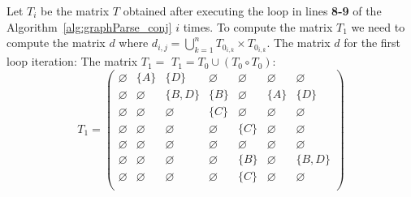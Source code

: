 Let $T_i$ be the matrix $T$ obtained after executing the loop in lines \textbf{8-9} of the Algorithm~\ref{alg:graphParse_conj} $i$ times. To compute the matrix $T_1$ we need to compute the matrix $d$ where $d_{i,j} = \bigcup^{n}_{k=1}{T_{0_{i,k}} \times T_{0_{i,k}}}$. The matrix $d$ for the first loop iteration:
    \noindent
 The matrix $T_1 = $ $T_1 = T_0 \cup (T_0 \circ T_0)$:
{\small
    \[
    T_1 = \begin{pmatrix}
    \varnothing & \{A\} & \{D\} & \varnothing & \varnothing & \varnothing & \varnothing \\
    
    \varnothing & \varnothing & \{B, D\} & \{B\} & \varnothing & \{A\} & \{D\} \\
    
    \varnothing & \varnothing & \varnothing & \{C\} & \varnothing & \varnothing & \varnothing \\
    
    \varnothing & \varnothing & \varnothing & \varnothing & \{C\} & \varnothing & \varnothing \\
    
    \varnothing & \varnothing & \varnothing & \varnothing & \varnothing & \varnothing & \varnothing \\
    
    \varnothing & \varnothing & \varnothing & \varnothing & \{B\} & \varnothing & \{B, D\} \\
    
    \varnothing & \varnothing & \varnothing & \varnothing & \{C\} & \varnothing & \varnothing \\
    \end{pmatrix}
    \]
    }
